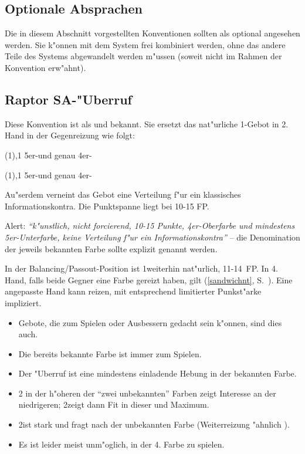 \begin{appendix}
\section{Optionale Absprachen}

Die in diesem Abschnitt vorgestellten Konventionen sollten als optional
angesehen werden.  Sie k"onnen mit dem System frei kombiniert werden, ohne das
andere Teile des Systems abgewandelt werden m"ussen (soweit nicht im Rahmen der
Konvention erw"ahnt).

\subsection{Raptor SA-"Uberruf}

Diese Konvention ist als  und 
bekannt. Sie ersetzt das nat"urliche 1\SA-Gebot in 2. Hand in der Gegenreizung wie folgt:
\cite{farebrother02}

\bdsc
	\item[(1\uf)\sep{}1\SA] 5\pl{}er-\aufa und genau 4er-\ofa
	\item[(1\of)\sep{}1\SA] 5\pl{}er-\ufa und genau 4er-\aofa
\edsc

Au"serdem verneint das Gebot eine Verteilung f"ur ein klassisches
Informationskontra. Die Punktspanne liegt bei 10-15 FP.

Alert: \emph{"`k"unstlich, nicht forcierend, 10-15 Punkte, 4er-Oberfarbe und
mindestens 5er-Unterfarbe, keine Verteilung f"ur ein Informationskontra"'} --
die Denomination der jeweils bekannten Farbe sollte explizit genannt werden.

In der Balancing/Passout-Position ist 1\SA weiterhin na\-t"ur\-lich, 11-14~FP.
In 4. Hand, falls beide Gegner eine Farbe gereizt haben, gilt  (\ref{sandwichnt}, S.~\pageref{sandwichnt}).
Eine angepasste Hand kann  reizen, mit entsprechend limitierter
Punkst"arke impliziert.


\begin{itemize}
	\item Gebote, die zum Spielen oder Ausbessern gedacht sein k"onnen,
	  sind dies auch.
	\item Die bereits bekannte Farbe ist immer zum Spielen.
	\item Der "Uberruf ist eine mindestens einladende Hebung in der
	  bekannten Farbe.
	\item 2 in der h"oheren der "`zwei unbekannten"' Farben zeigt Interesse
	  an der niedrigeren; 2\SA zeigt dann Fit in dieser und Maximum.
	\item 2\SA ist stark und fragt nach der unbekannten Farbe
	  (Weiterreizung "ahnlich ).
	\item Es ist leider meist unm"oglich, in der 4. Farbe zu spielen.
\end{itemize}


\end{appendix}
